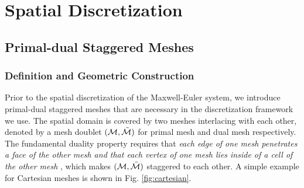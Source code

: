 \documentclass{article}
\begin{document}

\section{Spatial Discretization} \label{sec:spatial_discretization}
\subsection{Primal-dual Staggered Meshes} \label{sec:mesh-duality}
\subsubsection{Definition and Geometric Construction}
Prior to the spatial discretization of the Maxwell-Euler system, we introduce primal-dual staggered meshes that are necessary in the discretization framework we use. The spatial domain is covered by two meshes interlacing with each other, denoted by a mesh doublet $(\mathcal{M}, \Tilde{\mathcal{M}})$ for primal mesh and dual mesh respectively. The fundamental duality property requires that \emph{each edge of one mesh penetrates a face of the other mesh and that each vertex of one mesh lies inside of a cell of the other mesh} \cite[][Sec. 2]{weiland_2003}, which makes $(\mathcal{M}, \Tilde{\mathcal{M}})$ staggered to each other. A simple example for Cartesian meshes is shown in Fig. \ref{fig:cartesian}.
\end{document}
